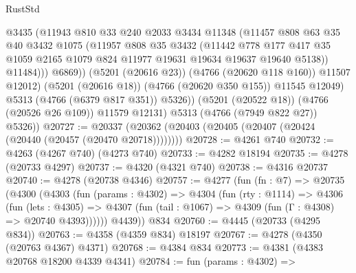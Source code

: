 \begin{lexlean}{RustStd}
\begin{coremodule}
{\begin{coremodule}
{{{{{{{{{{{{{{{{{{{{{{{{{{{{{{{{{{{                        @3435
                        (@11943
                          @810
                          @33
                          @240
                          @2033
                          @3434
                          @11348
                          (@11457
                            @808
                            @63
                            @35
                            @40
                            @3432
                            @1075
                            (@11957
                              @808
                              @35
                              @3432
                              (@11442
                                @778
                                @177
                                @417
                                @35
                                @1059
                                @2165
                                @1079
                                @824
                                @11977
                                @19631
                                @19634
                                @19637
                                @19640
                                @5138))
                            @11484)))
                      @6869))
                  (@5201 (@20616 @23))
                  (@4766 (@20620 @118 @160))
                  @11507
                  @12012)
                (@5201 (@20616 @18))
                (@4766 (@20620 @350 @155))
                @11545
                @12049)
              @5313
              (@4766 (@6379 @817 @351))
              @5326))
          (@5201 (@20522 @18))
          (@4766 (@20526 @26 @109))
          @11579
          @12131)
        @5313
        (@4766 (@7949 @822 @27))
        @5326))
@20727 := @20337 (@20362 (@20403 (@20405 (@20407 (@20424 (@20440 (@20457 (@20470 @20718))))))))
@20728 := @4261 @740
@20732 := @4263 (@4267 @740) (@4273 @740)
@20733 := @4282 @18194
@20735 := @4278 (@20733 @4297)
@20737 := @4320 (@4321 @740)
@20738 := @4316 @20737
@20740 := @4278 (@20738 @4346)
@20757 := @4277
    (fun (fn : @7) =>
    @20735
      (@4300
        (@4303
          (fun (params : @4302) =>
          @4304
            (fun (rty : @1114) =>
            @4306
              (fun (lets : @4305) =>
              @4307 (fun (tail : @1067) => @4309 (fun (Γ : @4308) => @20740 @4393))))))
        @4439))
    @834
@20760 := @4445 (@20733 (@4295 @834))
@20763 := @4358 (@4359 @834) @18197
@20767 := @4278 (@4350 (@20763 @4367) @4371)
@20768 := @4384 @834
@20773 := @4381 (@4383 @20768 @18200 @4339 @4341)
@20784 := fun (params : @4302) =>
}}}}}}}}}}}}}}}}}}}}}}}}}}}}}}}}}}}
\end{coremodule}}
\end{coremodule}
\end{lexlean}
